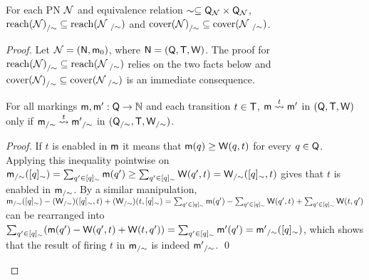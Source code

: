 \begin{textAtEnd}[category=quotients]
\begin{lemma}\label{lemma:quotient-soundness}
  For each PN $\mathcal{N}$ and equivalence relation
  $\sim \subseteq \mathsf{Q}_{\mathcal{N}} \times \mathsf{Q}_{\mathcal{N}}$,
  ${\mathrm{reach}({\mathcal{N}})}_{/\sim} \subseteq \mathrm{reach}({{\mathcal{N}~}_{/\sim}})$
  and ${\mathrm{cover}({\mathcal{N}})}_{/\sim} \subseteq \mathrm{cover}({{\mathcal{N}~}_{/\sim}})$.
\end{lemma}
\begin{proof}
  Let $\mathcal{N}=(\mathsf{N},\mathsf{m}_0)$,
  where $\mathsf{N}=(\mathsf{Q},\mathsf{T},\mathsf{W})$.
  The proof for ${\mathrm{reach}({\mathcal{N}})}_{/\sim} \subseteq \mathrm{reach}({{\mathcal{N}}_{~/\sim}})$
  relies on the two facts below and
  ${\mathrm{cover}({\mathcal{N}})}_{/\sim} \subseteq \mathrm{cover}({{\mathcal{N}}_{~/\sim}})$
  is an immediate consequence. 

  \begin{fact}
    For all markings $\mathsf{m},\mathsf{m}' : \mathsf{Q}\rightarrow\mathbb{N}$ and each transition $t \in \mathsf{T}$,
    $\mathsf{m} \stackrel{t}{\leadsto} \mathsf{m}'$ in $(\mathsf{Q},\mathsf{T},\mathsf{W})$ only if
    ${\mathsf{m}}_{/\sim} \stackrel{t}{\leadsto} {\mathsf{m}'}_{/\sim}$
    in $({\mathsf{Q}}_{/\sim}, \mathsf{T}, {\mathsf{W}}_{/\sim})$.
  \end{fact}
  \begin{proof}
    If $t$ is enabled in $\mathsf{m}$ it means that
    $\mathsf{m}(q) \geq \mathsf{W}(q,t)$ for every $q \in \mathsf{Q}$.
    Applying this inequality pointwise on
    ${\mathsf{m}}_{/\sim}([q]_\sim)
      = \sum_{q' \in [q]_\sim} \mathsf{m}(q')
      \geq \sum_{q' \in [q]_\sim} \mathsf{W}(q',t)
      = {\mathsf{W}}_{/\sim}([q]_\sim,t)$
    gives that $t$ is enabled in ${\mathsf{m}}_{/\sim}$.
    By a similar manipulation,
    ${\mathsf{m}}_{/\sim}([q]_\sim)
      - ({\mathsf{W}}_{/\sim})([q]_\sim,t)
      + ({\mathsf{W}}_{/\sim})(t,[q]_\sim)
    = \sum_{q' \in [q]_\sim} \mathsf{m}(q')
      - \sum_{q' \in [q]_\sim} \mathsf{W}(q',t)
      + \sum_{q' \in [q]_\sim} \mathsf{W}(t,q')$
    can be rearranged into
    $\sum_{q' \in [q]_\sim} (\mathsf{m}(q') - \mathsf{W}(q',t) + \mathsf{W}(t,q'))
      = \sum_{q' \in [q]_\sim} \mathsf{m}'(q')
      = {\mathsf{m}'}_{/\sim}([q]_\sim)$,
    which shows that the result of firing $t$ in ${\mathsf{m}}_{/\sim}$
    is indeed ${\mathsf{m}'}_{/\sim}$.
    \qed
  \end{proof}


\end{proof}
\end{textAtEnd}
